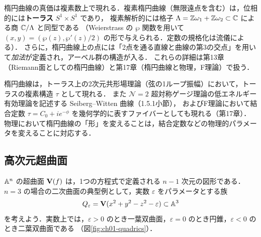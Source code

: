 楕円曲線の真価は複素数上で現れる．複素楕円曲線（無限遠点を含む）は，位相的には\textbf{トーラス} $S^1\times S^1$ であり，
複素解析的には格子 $\Lambda=\mathbb{Z}\omega_1+\mathbb{Z}\omega_2\subset\mathbb{C}$ による商 $\mathbb{C}/\Lambda$ と同型である
（Weierstrass の $\wp$ 関数を用いて $(x,y)=(\wp(z),\wp'(z)/2)$ の形で与えられる．定数の規格化は流儀による）．
さらに，楕円曲線上の点には「2点を通る直線と曲線の第3の交点」を用いて\emph{加法}が定義され，アーベル群の構造が入る．
これらの詳細は第13章（Riemann面としての楕円曲線）と第17章（楕円曲線と物理，F理論）で扱う．

\begin{physbox}[楕円曲線と物理]
楕円曲線は，トーラス上の2次元共形場理論（弦の1ループ振幅）において，トーラスの複素構造 $\tau$ として現れる．
また $\mathcal N=2$ 超対称ゲージ理論の低エネルギー有効理論を記述する Seiberg--Witten 曲線（1.5.1小節），
およびF理論において結合定数 $\tau=C_0+ie^{-\phi}$ を幾何学的に表すファイバーとしても現れる（第17章）．
物理において楕円曲線の「形」を変えることは，結合定数などの物理的パラメータを変えることに対応する．
\end{physbox}

\subsection{高次元超曲面}

$\mathbb{A}^n$ の超曲面 $\mathbf{V}(f)$ は，1つの方程式で定義される $n-1$ 次元の図形である．
$n=3$ の場合の二次曲面の典型例として，実数 $\varepsilon$ をパラメータとする族
\[
  Q_\varepsilon=\mathbf{V}(x^2+y^2-z^2-\varepsilon)\subset\mathbb{A}^3
\]
を考えよう．実数上では，$\varepsilon>0$ のとき一葉双曲面，$\varepsilon=0$ のとき円錐，$\varepsilon<0$ のとき二葉双曲面である
（図\ref{fig:ch01-quadrics}）．

